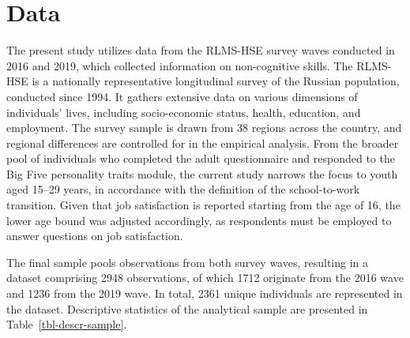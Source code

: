 \documentclass[
]{interact}
\begin{document}
\section{Data}\label{data}

The present study utilizes data from the RLMS-HSE survey waves conducted
in 2016 and 2019, which collected information on non-cognitive skills.
The RLMS-HSE is a nationally representative longitudinal survey of the
Russian population, conducted since 1994. It gathers extensive data on
various dimensions of individuals' lives, including socio-economic
status, health, education, and employment. The survey sample is drawn
from 38 regions across the country, and regional differences are
controlled for in the empirical analysis. From the broader pool of
individuals who completed the adult questionnaire and responded to the
Big Five personality traits module, the current study narrows the focus
to youth aged 15--29 years, in accordance with the definition of the
school-to-work transition. Given that job satisfaction is reported
starting from the age of 16, the lower age bound was adjusted
accordingly, as respondents must be employed to answer questions on job
satisfaction.

The final sample pools observations from both survey waves, resulting in
a dataset comprising 2948 observations, of which 1712 originate from the
2016 wave and 1236 from the 2019 wave. In total, 2361 unique individuals
are represented in the dataset. Descriptive statistics of the analytical
sample are presented in Table~\ref{tbl-descr-sample}.
\end{document}
